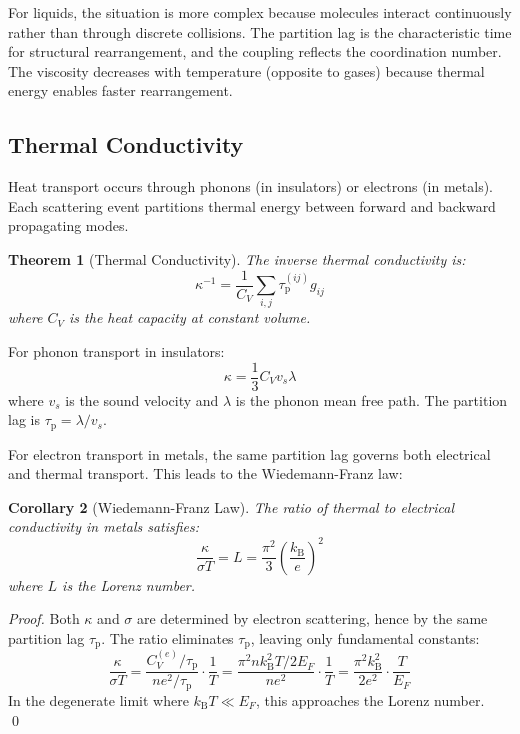 \documentclass[twocolumn,10pt,aps,prd,superscriptaddress,nofootinbib]{revtex4-2}
\newtheorem{theorem}{Theorem}[section]
\newtheorem{corollary}[theorem]{Corollary}
\theoremstyle{remark}
\newcommand{\kB}{k_{\mathrm{B}}}
\newcommand{\tauP}{\tau_{\mathrm{p}}}
\newcommand{\Gij}{g_{ij}}
\begin{document}
For liquids, the situation is more complex because molecules interact continuously rather than through discrete collisions. The partition lag is the characteristic time for structural rearrangement, and the coupling reflects the coordination number. The viscosity decreases with temperature (opposite to gases) because thermal energy enables faster rearrangement.

\subsection{Thermal Conductivity}

Heat transport occurs through phonons (in insulators) or electrons (in metals). Each scattering event partitions thermal energy between forward and backward propagating modes.

\begin{theorem}[Thermal Conductivity]
\label{thm:thermal_conductivity}
The inverse thermal conductivity is:
\begin{equation}
\kappa^{-1} = \frac{1}{C_V} \sum_{i,j} \tauP^{(ij)} \Gij
\label{eq:thermal_conductivity}
\end{equation}
where $C_V$ is the heat capacity at constant volume.
\end{theorem}

For phonon transport in insulators:
\begin{equation}
\kappa = \frac{1}{3} C_V v_s \lambda
\label{eq:phonon_conductivity}
\end{equation}
where $v_s$ is the sound velocity and $\lambda$ is the phonon mean free path. The partition lag is $\tauP = \lambda/v_s$.

For electron transport in metals, the same partition lag governs both electrical and thermal transport. This leads to the Wiedemann-Franz law:

\begin{corollary}[Wiedemann-Franz Law]
\label{cor:wiedemann_franz}
The ratio of thermal to electrical conductivity in metals satisfies:
\begin{equation}
\frac{\kappa}{\sigma T} = L = \frac{\pi^2}{3} \left(\frac{\kB}{e}\right)^2
\label{eq:wiedemann_franz}
\end{equation}
where $L$ is the Lorenz number.
\end{corollary}

\begin{proof}
Both $\kappa$ and $\sigma$ are determined by electron scattering, hence by the same partition lag $\tauP$. The ratio eliminates $\tauP$, leaving only fundamental constants:
\begin{equation}
\frac{\kappa}{\sigma T} = \frac{C_V^{(e)}/\tauP}{ne^2/\tauP} \cdot \frac{1}{T} = \frac{\pi^2 n \kB^2 T / 2E_F}{ne^2} \cdot \frac{1}{T} = \frac{\pi^2 \kB^2}{2e^2} \cdot \frac{T}{E_F}
\end{equation}
In the degenerate limit where $\kB T \ll E_F$, this approaches the Lorenz number. \qed
\end{proof}
\end{document}
